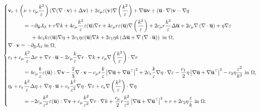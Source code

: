 \documentclass[oneside,11pt]{book}
\numberwithin{equation}{section}
\begin{document}
\begin{equation}
    \label{adjoint k-epsilon}
    \left\{\begin{split}
        &{\bf v}_t + \left(\nu + c_\mu\frac{k^2}{\varepsilon}\right)\left(\nabla(\nabla\cdot{\bf v}) + \Delta{\bf v}\right) + 2c_\mu\varepsilon({\bf v})\nabla\left(\frac{k^2}{\varepsilon}\right) + \nabla\overline{\bf u}{\bf v} + (\overline{\bf u}\cdot\nabla){\bf v} - \nabla q\\
        &\hspace{1cm} = -\partial_{\overline{\bf u}}J_\Omega + r\nabla k + 4c_\mu\frac{k^2}{\varepsilon}\varepsilon(\overline{\bf u})\nabla r + 4c_\mu r\varepsilon(\overline{\bf u})\nabla\left(\frac{k^2}{\varepsilon}\right) + 2c_\mu r\frac{k^2}{\varepsilon}\Delta\overline{\bf u} + 2c_\mu\nabla\left(\nabla\cdot\overline{\bf u}\right)  + \eta\nabla\varepsilon\\
        & \hspace{1.5cm}+ 4c_1k\varepsilon(\overline{\bf u})\nabla\eta + 2c_1\eta\varepsilon(\overline{\bf u})\nabla k + 2c_1\eta k\left(\Delta\overline{\bf u} + \nabla\left(\nabla\cdot\overline{\bf u}\right)\right) \mbox{ in } \Omega,\\
        &\nabla\cdot{\bf v} = -\partial_{\overline{p}}J_\Omega \mbox{ in } \Omega,\\
        &r_t + c_\mu\frac{k^2}{\varepsilon}\Delta r + \nabla r\cdot\overline{\bf u} - 2c_\mu\frac{k}{\varepsilon}\nabla r\cdot\nabla k + c_\mu\nabla\left(\frac{k^2}{\varepsilon}\right)\cdot\nabla r\\
        &\hspace{1cm} = 4c_\mu\frac{k}{\varepsilon}\varepsilon(\overline{\bf u}):\nabla{\bf v} - \frac{2}{3}\nabla\cdot{\bf v} - c_\mu r\frac{k}{\varepsilon}\left|\nabla\overline{\bf u} + \nabla\overline{\bf u}^\top\right|^2 + 2c_\varepsilon\frac{k}{\varepsilon}\nabla\eta\cdot\nabla\varepsilon - \frac{c_1}{2}\eta\left|\nabla\overline{\bf u} + \nabla\overline{\bf u}^\top\right|^2 - c_2\eta\frac{\varepsilon^2}{k^2} \mbox{ in } \Omega,\\
        &\eta_t + c_\varepsilon\frac{k^2}{\varepsilon}\Delta\eta + \nabla\eta\cdot\overline{\bf u} + c_\varepsilon\frac{k^2}{\varepsilon^2}\nabla\eta\cdot\nabla\varepsilon + c_\varepsilon\nabla\left(\frac{k^2}{\varepsilon}\right)\cdot\nabla\eta\\
        &\hspace{1cm} = -2c_\mu\frac{k^2}{\varepsilon^2}\varepsilon(\overline{\bf u}):\nabla{\bf v} + c_\mu\frac{k^2}{\varepsilon^2}\nabla r\cdot\nabla k + \frac{c_\mu}{2}r\frac{k^2}{\varepsilon^2}\left|\nabla\overline{\bf u} + \nabla\overline{\bf u}^\top\right|^2 + r + 2c_2\eta\frac{\varepsilon}{k} \mbox{ in } \Omega.
    \end{split}\right.    
\end{equation}
\end{document}
